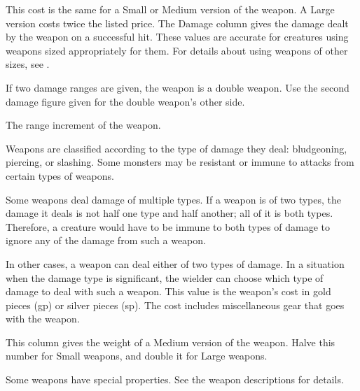         \par This cost is the same for a Small or Medium version of the weapon. A Large version costs twice the listed price.
         The Damage column gives the damage dealt by the weapon on a successful hit.
        These values are accurate for creatures using weapons sized appropriately for them.
        For details about using weapons of other sizes, see .

        If two damage ranges are given, the weapon is a double weapon. Use the second damage figure given for the double weapon's other side.

         The range increment of the weapon.

         Weapons are classified according to the type of damage they deal: bludgeoning, piercing, or slashing. Some monsters may be resistant or immune to attacks from certain types of weapons.

        Some weapons deal damage of multiple types. If a weapon is of two types, the damage it deals is not half one type and half another; all of it is both types. Therefore, a creature would have to be immune to both types of damage to ignore any of the damage from such a weapon.

        In other cases, a weapon can deal either of two types of damage. In a situation when the damage type is significant, the wielder can choose which type of damage to deal with such a weapon.
         This value is the weapon's cost in gold pieces (gp) or silver pieces (sp). The cost includes miscellaneous gear that goes with the weapon.

         This column gives the weight of a Medium version of the weapon. Halve this number for Small weapons, and double it for Large weapons.

         Some weapons have special properties. See the weapon
        descriptions for details.

